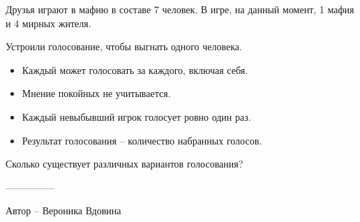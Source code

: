 \question
Друзья играют в мафию в составе 7 человек. В игре, на данный момент, 1 мафия и 4 мирных жителя.

Устроили голосование, чтобы выгнать одного человека.

\begin{itemize}
    \item Каждый может голосовать за каждого, включая себя.
    \item Мнение покойных не учитывается.
    \item     Каждый невыбывший игрок голосует ровно один раз.
    \item Результат голосования -- количество набранных голосов.
\end{itemize}

Сколько существует различных вариантов голосования?

---------------

Автор -- Вероника Вдовина
